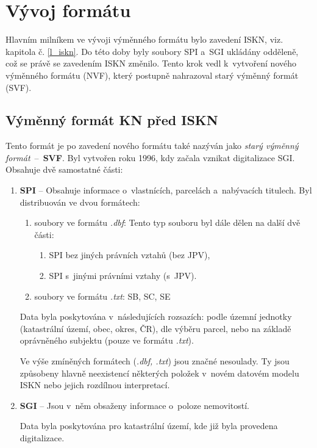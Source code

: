 \documentclass[a4paper,12pt,oneside]{book}
\begin{document}
\section{Vývoj formátu}

Hlavním milníkem ve vývoji výměnného formátu bylo zavedení ISKN,
viz. kapitola č. \ref{l_iskn}. Do této doby byly soubory SPI a~SGI
ukládány odděleně, což se právě se zavedením ISKN změnilo. Tento krok
vedl k~vytvoření nového výměnného formátu (NVF), který postupně
nahrazoval starý výměnný formát (SVF). \cite{dp_landa}

\subsection{Výměnný formát KN před ISKN}

Tento formát je po zavedení nového formátu také nazýván jako \textit{starý
  výměnný formát}~--~\textbf{SVF}. Byl vytvořen roku 1996, kdy začala
vznikat digitalizace SGI. Obsahuje dvě samostatné části:

\begin{enumerate}
 \item \textbf{SPI} -- Obsahuje informace o~vlastnících, parcelách a~nabývacích titulech. Byl distribuován ve dvou formátech:
 \begin{enumerate}
  \item soubory ve formátu \textit{.dbf}: Tento typ souboru byl dále dělen na další dvě části:
  
  \begin{enumerate}
   \item SPI bez jiných právních vztahů (bez JPV),
   \item SPI s~jinými právními vztahy (s~JPV).
  \end{enumerate}
  
  \item soubory ve formátu \textit{.txt}: SB, SC, SE
 \end{enumerate}
 
 Data byla poskytována v~následujících rozsazích: podle územní
 jednotky (katastrální území, obec, okres, ČR), dle výběru parcel,
 nebo na základě oprávněného subjektu (pouze ve formátu
 \textit{.txt}).
 
 Ve výše zmíněných formátech (\textit{.dbf, .txt}) jsou značné
 nesoulady. Ty jsou způsobeny hlavně neexistencí některých položek
 v~novém datovém modelu ISKN nebo jejich rozdílnou interpretací.

 \item \textbf{SGI} -- Jsou v~něm obsaženy informace o~poloze nemovitostí. 
 
   Data byla poskytována pro katastrální území, kde již byla provedena
   digitalizace.
\end{enumerate}
\end{document}
